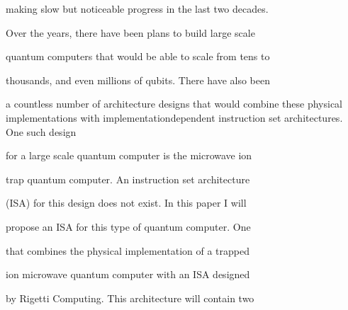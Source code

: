 \documentclass[a4paper,portrait,12pt]{article}
\begin{document}
\begin{flushleft}
making slow but noticeable progress in the last two decades.
\end{flushleft}


\begin{flushleft}
Over the years, there have been plans to build large scale
\end{flushleft}


\begin{flushleft}
quantum computers that would be able to scale from tens to
\end{flushleft}


\begin{flushleft}
thousands, and even millions of qubits. There have also been
\end{flushleft}


\begin{flushleft}
a countless number of architecture designs that would combine these physical implementations with implementationdependent instruction set architectures. One such design
\end{flushleft}


\begin{flushleft}
for a large scale quantum computer is the microwave ion
\end{flushleft}


\begin{flushleft}
trap quantum computer. An instruction set architecture
\end{flushleft}


\begin{flushleft}
(ISA) for this design does not exist. In this paper I will
\end{flushleft}


\begin{flushleft}
propose an ISA for this type of quantum computer. One
\end{flushleft}


\begin{flushleft}
that combines the physical implementation of a trapped
\end{flushleft}


\begin{flushleft}
ion microwave quantum computer with an ISA designed
\end{flushleft}


\begin{flushleft}
by Rigetti Computing. This architecture will contain two
\end{flushleft}
\end{document}

